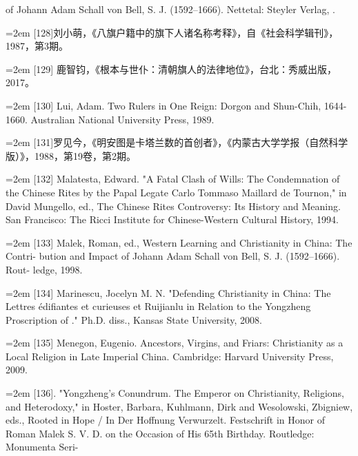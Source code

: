\space%
of Johann Adam Schall von Bell, S. J. (1592–1666). Nettetal: Steyler Verlag,%
.%
\par
\noindent\hangindent=2em
[128]刘小萌，《八旗户籍中的旗下人诸名称考释》，自《社会科学辑刊》，%
1987，第3期。%
\par
\noindent\hangindent=2em
[129] 鹿智钧，《根本与世仆：清朝旗人的法律地位》，台北：秀威出版，2017。%
\par
\noindent\hangindent=2em
[130] Lui, Adam. Two Rulers in One Reign: Dorgon and Shun-Chih, 1644-1660.%
\space%
Australian National University Press, 1989.%
\par
\noindent\hangindent=2em
[131]罗见今，《明安图是卡塔兰数的首创者》，《内蒙古大学学报（自然科学%
版）》，1988，第19卷，第2期。%
\par
\noindent\hangindent=2em
[132] Malatesta, Edward. "A Fatal Clash of Wills: The Condemnation of the Chinese%
\space%
Rites by the Papal Legate Carlo Tommaso Maillard de Tournon," in David%
\space%
Mungello, ed., The Chinese Rites Controversy: Its History and Meaning. San%
\space%
Francisco: The Ricci Institute for Chinese-Western Cultural History, 1994.%
\par
\noindent\hangindent=2em
[133] Malek, Roman, ed., Western Learning and Christianity in China: The Contri-%
bution and Impact of Johann Adam Schall von Bell, S. J. (1592–1666). Rout-%
ledge, 1998.%
\par
\noindent\hangindent=2em
[134] Marinescu, Jocelyn M. N. "Defending Christianity in China: The Lettres%
édifiantes et curieuses et Ruijianlu in Relation to the Yongzheng Proscription of%
." Ph.D. diss., Kansas State University, 2008.%
\par
\noindent\hangindent=2em
[135] Menegon, Eugenio. Ancestors, Virgins, and Friars: Christianity as a Local Religion in%
\space%
Late Imperial China. Cambridge: Harvard University Press, 2009.%
\par
\noindent\hangindent=2em
[136]. "Yongzheng's Conundrum. The Emperor on Christianity, Religions, and%
\space%
Heterodoxy," in Hoster, Barbara, Kuhlmann, Dirk and Wesolowski, Zbigniew,%
\space%
eds., Rooted in Hope / In Der Hoffnung Verwurzelt. Festschrift in Honor of Roman%
\space%
Malek S. V. D. on the Occasion of His 65th Birthday. Routledge: Monumenta Seri-%
